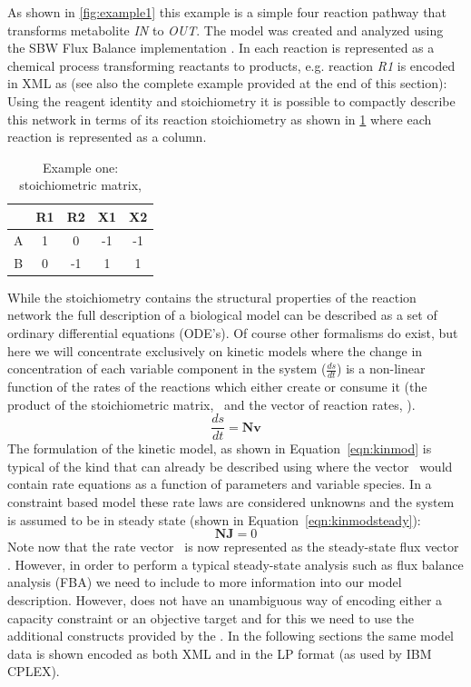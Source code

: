 As shown in \ref{fig:example1} this example is a simple four reaction
pathway that transforms metabolite \textit{IN} to \textit{OUT}. The model was created and analyzed using the \textsf{SBW Flux Balance} \FBC implementation \cite{sbwfba, sbw}. In \SBML each reaction is represented as a chemical process transforming reactants to products, e.g. reaction \textit{R1} is encoded in XML as (see also the complete example provided at the end of this section):
%
%
Using the reagent identity and stoichiometry it is possible to compactly describe this network in terms of its reaction stoichiometry as shown in \ref{tble:ex1nmat} where each reaction is represented as a column.
\begin{table}[h]
  \centering
    \begin{tabular}{c|cccc}
          & R1 & R2 & X1 & X2 \\ \hline
        A & 1 &  0 & -1 & -1 \\
        B & 0 & -1 &  1 &  1 \\
    \end{tabular}
  \caption{Example one: stoichiometric matrix, \Nmat}
  \label{tble:ex1nmat}
\end{table}
%
While the stoichiometry contains the structural properties of the reaction network the full description of a biological model can be described as a set of ordinary differential equations (ODE's). Of course other formalisms do exist, but here we will concentrate exclusively on kinetic models where the change in concentration of each variable component in the system ($\frac{ds}{dt}$) is a non-linear function of the rates of the reactions which either create or consume it (the product of the stoichiometric matrix, \Nmat\ and the vector of reaction rates, \vvec).
%
\begin{equation}\label{eqn:kinmod}
  \frac{ds}{dt} = \textbf{Nv}
\end{equation}
%
The formulation of the kinetic model, as shown in Equation~\ref{eqn:kinmod}
is typical of the kind that can already be described using \sbmlthreecore
where the vector \vvec\ would contain rate equations as a function of
parameters and variable species. In a constraint based model these rate laws are considered unknowns and the system is assumed to be in steady state (shown in Equation~\ref{eqn:kinmodsteady}):
%
\begin{equation}\label{eqn:kinmodsteady}
  \textbf{NJ} = 0
\end{equation}
%
Note now that the rate vector \vvec\ is now represented as the steady-state flux vector \Jvec. However, in order to perform a typical steady-state analysis such as flux balance analysis (FBA) we need to include to more  information into our model description. However, \sbmlthreecore does not have an unambiguous way of encoding either a capacity constraint or an objective target and for this we need to use the additional constructs provided by the \FBCPackage. In the following sections the same model data is shown encoded as both XML and in the LP format (as used by IBM CPLEX).

